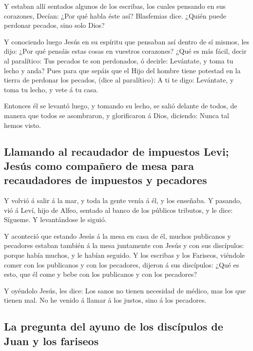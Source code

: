  Y estaban allí sentados algunos de los escribas, los
cuales pensando en sus corazones,  Decían: ¿Por qué habla
éste así? Blasfemias dice. ¿Quién puede perdonar pecados, sino solo
Dios?

 Y conociendo luego Jesús en su espíritu que pensaban así
dentro de sí mismos, les dijo: ¿Por qué pensáis estas cosas en vuestros
corazones?  ¿Qué es más fácil, decir al paralítico: Tus
pecados te son perdonados, ó decirle: Levántate, y toma tu lecho y anda?
 Pues para que sepáis que el Hijo del hombre tiene
potestad en la tierra de perdonar los pecados, (dice al paralítico):
 A ti te digo: Levántate, y toma tu lecho, y vete á tu
casa.

 Entonces él se levantó luego, y tomando su lecho, se
salió delante de todos, de manera que todos se asombraron, y
glorificaron á Dios, diciendo: Nunca tal hemos visto.

\hypertarget{llamando-al-recaudador-de-impuestos-levi-jesuxfas-como-compauxf1ero-de-mesa-para-recaudadores-de-impuestos-y-pecadores}{%
\subsection{Llamando al recaudador de impuestos Levi; Jesús como
compañero de mesa para recaudadores de impuestos y
pecadores}\label{llamando-al-recaudador-de-impuestos-levi-jesuxfas-como-compauxf1ero-de-mesa-para-recaudadores-de-impuestos-y-pecadores}}

 Y volvió á salir á la mar, y toda la gente venía á él, y
los enseñaba.  Y pasando, vió á Leví, hijo de Alfeo,
sentado al banco de los públicos tributos, y le dice: Sígueme. Y
levantándose le siguió.

 Y aconteció que estando Jesús á la mesa en casa de él,
muchos publicanos y pecadores estaban también á la mesa juntamente con
Jesús y con sus discípulos: porque había muchos, y le habían seguido.
 Y los escribas y los Fariseos, viéndole comer con los
publicanos y con los pecadores, dijeron á sus discípulos: ¿Qué es esto,
que él come y bebe con los publicanos y con los pecadores?

 Y oyéndolo Jesús, les dice: Los sanos no tienen
necesidad de médico, mas los que tienen mal. No he venido á llamar á los
justos, sino á los pecadores.

\hypertarget{la-pregunta-del-ayuno-de-los-discuxedpulos-de-juan-y-los-fariseos}{%
\subsection{La pregunta del ayuno de los discípulos de Juan y los
fariseos}\label{la-pregunta-del-ayuno-de-los-discuxedpulos-de-juan-y-los-fariseos}}

